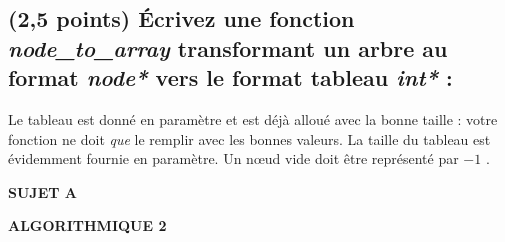 \documentclass[11pt,a4paper]{article}
\newcommand{\TitreMatiere}{Algorithmique 2}
\begin{document}
\clearpage


\subsection{(2,5 points) \'Ecrivez une fonction \og \textit{node\_to\_array} \fg{} transformant un arbre au format \textit{node*} vers le format tableau \textit{int*} : }

\noindent Le tableau est donné en paramètre et est déjà alloué avec la bonne taille : votre fonction ne doit \textit{que} le remplir avec les bonnes valeurs.
La taille du tableau est évidemment fournie en paramètre.
Un nœud vide doit être représenté par \og $-1$ \fg.

\begin{center}
\end{center}




\clearpage




\vfillFirst

\begin{center}

\begin{LARGE}
\textbf{SUJET A}

\bigskip

\textbf{\MakeUppercase{\TitreMatiere}}
\end{LARGE}

\end{center}

\vfillLast
\end{document}
